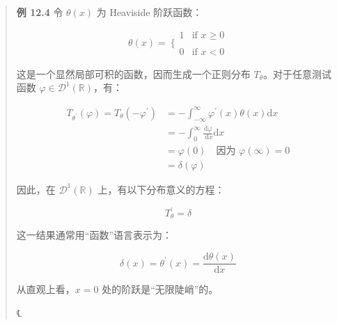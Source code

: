 \begin{quote}
\textbf{例 12.4} 令 \(\theta(x)\) 为 Heaviside 阶跃函数：

\[\theta(x) = \left. \ \{\begin{array}{ll}
1 & \mathrm{\text{if }}x \geq 0 \\
 \\
0 & \mathrm{\text{if }}x < 0
\end{array} \right.\]

这是一个显然局部可积的函数，因而生成一个正则分布
\(T_{\theta}\)。对于任意测试函数
\(\varphi \in \mathcal{D}^{1}\left( \mathbb{R} \right)\)，有：

\[\begin{aligned}
T_{\theta^{\prime}}(\varphi) = T_{\theta}\left( - \varphi^{\prime} \right) & = - \int_{- \infty}^{\infty}\varphi^{\prime}(x)\theta(x)\mathrm{d}x \\
 & = - \int_{0}^{\infty}\frac{\mathrm{d}\varphi}{\mathrm{\: d}x}\mathrm{d}x \\
 & = \varphi(0)\quad\mathrm{\text{因为 }}\varphi(\infty) = 0 \\
 & = \delta(\varphi)
\end{aligned}\]

因此，在 \(\mathcal{D}^{1}\left( \mathbb{R} \right)\)
上，有以下分布意义的方程：

\[T_{\theta}^{\prime} = \delta\]

这一结果通常用``函数''语言表示为：

\[\delta(x) = \theta^{\prime}(x) = \frac{\mathrm{d}\theta(x)}{\mathrm{d}x}\]

从直观上看，\(x = 0\) 处的阶跃是``无限陡峭''的。

℄~
\end{quote}

